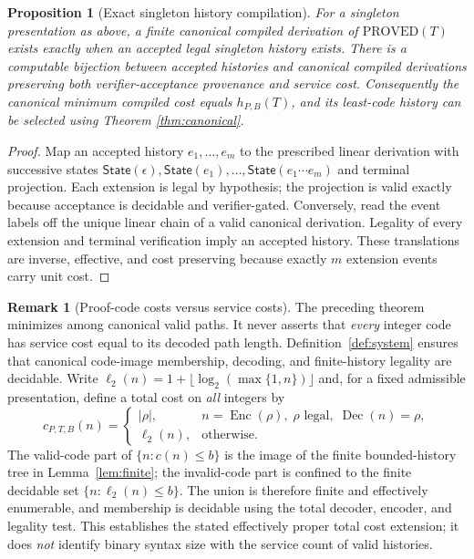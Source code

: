 \documentclass[11pt]{article}
\newtheorem{proposition}[theorem]{Proposition}
\theoremstyle{definition}
\newtheorem{remark}[theorem]{Remark}
\newcommand{\PROVED}{\mathrm{PROVED}}
\begin{document}
\begin{proposition}[Exact singleton history compilation]\label{prop:compile}
For a singleton presentation as above, a finite canonical compiled derivation of $\PROVED(T)$ exists exactly when an accepted legal singleton history exists. There is a computable bijection between accepted histories and canonical compiled derivations preserving both verifier-acceptance provenance and service cost. Consequently the canonical minimum compiled cost equals $h_{P,B}(T)$, and its least-code history can be selected using Theorem \ref{thm:canonical}.
\end{proposition}
\begin{proof}
Map an accepted history $e_1,\ldots,e_m$ to the prescribed linear derivation with successive states $\mathsf{State}(\epsilon),\mathsf{State}(e_1),\ldots,\mathsf{State}(e_1\cdots e_m)$ and terminal projection. Each extension is legal by hypothesis; the projection is valid exactly because acceptance is decidable and verifier-gated. Conversely, read the event labels off the unique linear chain of a valid canonical derivation. Legality of every extension and terminal verification imply an accepted history. These translations are inverse, effective, and cost preserving because exactly $m$ extension events carry unit cost.
\end{proof}

\begin{remark}[Proof-code costs versus service costs]\label{rem:cost}
The preceding theorem minimizes among canonical valid paths. It never asserts that \emph{every} integer code has service cost equal to its decoded path length. Definition~\ref{def:system} ensures that canonical code-image membership, decoding, and finite-history legality are decidable. Write $\ell_2(n)=1+\lfloor\log_2(\max\{1,n\})\rfloor$ and, for a fixed admissible presentation, define a total cost on \emph{all} integers by
\[
 c_{P,T,B}(n)=
 \begin{cases}
 |\rho|,&n=\operatorname{Enc}(\rho),\;\rho\text{ legal},\;\operatorname{Dec}(n)=\rho,\\
 \ell_2(n),&\text{otherwise}.
 \end{cases}
\]
The valid-code part of $\{n:c(n)\le b\}$ is the image of the finite bounded-history tree in Lemma~\ref{lem:finite}; the invalid-code part is confined to the finite decidable set $\{n:\ell_2(n)\le b\}$. The union is therefore finite and effectively enumerable, and membership is decidable using the total decoder, encoder, and legality test. This establishes the stated effectively proper total cost extension; it does \emph{not} identify binary syntax size with the service count of valid histories.
\end{remark}
\end{document}
